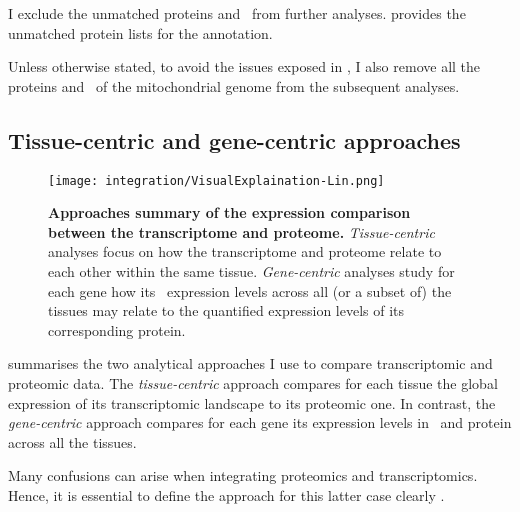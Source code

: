 I exclude the unmatched proteins and \mRNAs\ from further analyses.
 provides the unmatched protein lists
for the  annotation.\\
\vspace{-\baselineskip}

Unless otherwise stated, to avoid the issues exposed in ,
I also remove all the proteins and \mRNAs\ of the mitochondrial genome
from the subsequent analyses.

\vspace{-3mm}

\subsection{Tissue-centric and gene-centric approaches}
\vspace{-3mm}
\begin{figure}[!htb]
    \texttt{[image: integration/VisualExplaination-Lin.png]}\centering
    \vspace{-3mm}
    \caption[Summary of the expression comparison approaches between
    the transcriptome and proteome]{\label{fig:visualexp}\textbf{Approaches
    summary of the expression comparison between the transcriptome and proteome.}
    \emph{Tissue-centric} analyses focus on
    how the transcriptome and proteome relate to each other within the same tissue.
    \emph{Gene-centric} analyses study for each gene how its \mRNA\ expression
    levels across all (or a subset of) the tissues may relate to
    the quantified expression levels of its corresponding protein.
    }
\end{figure}

 summarises the two analytical approaches I use
to compare transcriptomic and proteomic data.
The \emph{tissue-centric} approach compares for each tissue
the global expression of its transcriptomic landscape to its proteomic one.
In contrast,
the \emph{gene-centric} approach compares for each gene
its expression levels in \mRNA\ and protein across all the tissues.

\begin{comment}
Although not explicitly indicated,
I use both tissue-centric and gene-centric approaches
in \Cref{ch:Transcriptomics,ch:proteomics}.
The \mRNAs\ studies are equivalent enough and
the proteomic studies so disparate that
global understanding remains unaffected without any precision.

On the other hand,
\end{comment}
Many confusions can arise
when integrating proteomics and transcriptomics.
Hence, it is essential
to define the approach for this latter case clearly .

